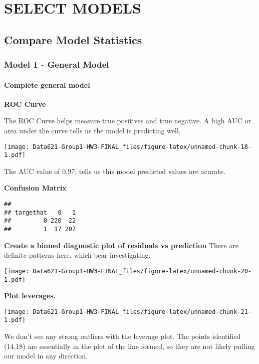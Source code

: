 \documentclass[
]{article}
\begin{document}
\hypertarget{select-models}{%
\section{SELECT MODELS}\label{select-models}}

\hypertarget{compare-model-statistics}{%
\subsection{Compare Model Statistics}\label{compare-model-statistics}}

\hypertarget{model-1---general-model}{%
\subsubsection{Model 1 - General Model}\label{model-1---general-model}}

\hypertarget{complete-general-model}{%
\paragraph{Complete general model}\label{complete-general-model}}

\textbf{ROC Curve}

The ROC Curve helps measure true positives and true negative. A high AUC
or area under the curve tells us the model is predicting well.

\texttt{[image: Data621-Group1-HW3-FINAL\_files/figure-latex/unnamed-chunk-18-1.pdf]}

The AUC value of 0.97, tells us this model predicted values are acurate.

\textbf{Confusion Matrix}

\begin{verbatim}
##          
## targethat   0   1
##         0 220  22
##         1  17 207
\end{verbatim}

\textbf{Create a binned diagnostic plot of residuals vs prediction}
There are definite patterns here, which bear investigating.

\texttt{[image: Data621-Group1-HW3-FINAL\_files/figure-latex/unnamed-chunk-20-1.pdf]}

\textbf{Plot leverages.}

\texttt{[image: Data621-Group1-HW3-FINAL\_files/figure-latex/unnamed-chunk-21-1.pdf]}

We don't see any strong outliers with the leverage plot. The points
identified (14,18) are essentially in the plot of the line formed, so
they are not likely pulling our model in any direction.
\end{document}
